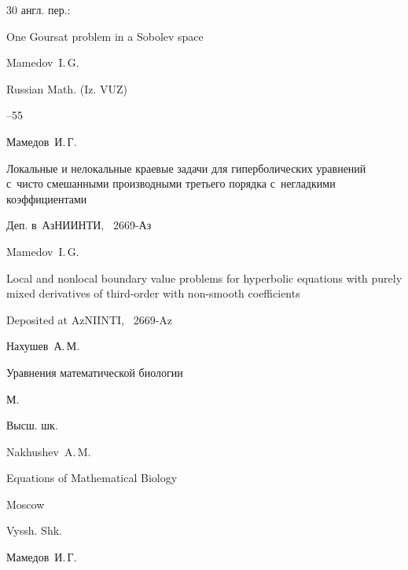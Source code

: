 \begin{thebibliography}{30}
\transl англ. пер.:~

\paper One Goursat problem in a Sobolev space

\by  Mamedov~I.\,G.

\jour Russian Math. (Iz. VUZ)




--55




\by Мамедов~И.\,Г. 

\preprint Локальные и нелокальные краевые задачи для гиперболических уравнений с~чисто смешанными производными третьего порядка с~негладкими коэффициентами 

\miscnote Деп. в~АзНИИНТИ, \No~2669-Аз



\misctransl

\by  Mamedov~I.\,G.

\preprint Local and nonlocal boundary value problems for hyperbolic equations with purely mixed derivatives of  third-order with non-smooth coefficients



\miscnote Deposited at AzNIINTI, \No~2669-Az






\by Нахушев~А.\,М.

\book Уравнения математической биологии

\publaddr М.

\publ Высш. шк.



\misctransl

\by Nakhushev~A.\,M.

\book Equations of Mathematical Biology

\publ Moscow

\publ Vyssh. Shk.






\by Мамедов~И.\,Г.


\end{thebibliography}
